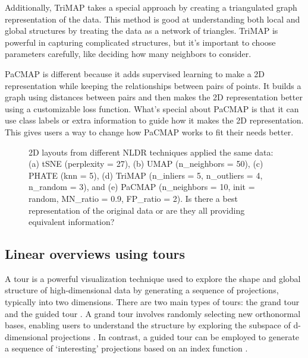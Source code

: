 \documentclass[
  12pt]{article}
\begin{document}
Additionally, TriMAP \citep{article02} takes a special approach by
creating a triangulated graph representation of the data. This method is
good at understanding both local and global structures by treating the
data as a network of triangles. TriMAP is powerful in capturing
complicated structures, but it's important to choose parameters
carefully, like deciding how many neighbors to consider.

PaCMAP \citep{Yingfan2021} is different because it adds supervised
learning to make a 2D representation while keeping the relationships
between pairs of points. It builds a graph using distances between pairs
and then makes the 2D representation better using a customizable loss
function. What's special about PaCMAP is that it can use class labels or
extra information to guide how it makes the 2D representation. This
gives users a way to change how PaCMAP works to fit their needs better.

\begin{figure}


\caption{\label{fig-nldervis}2D layouts from different NLDR techniques
applied the same data: (a) tSNE (perplexity = 27), (b) UMAP
(n\_neighbors = 50), (c) PHATE (knn = 5), (d) TriMAP (n\_inliers = 5,
n\_outliers = 4, n\_random = 3), and (e) PaCMAP (n\_neighbors = 10, init
= random, MN\_ratio = 0.9, FP\_ratio = 2). Is there a best
representation of the original data or are they all providing equivalent
information?}

\end{figure}%

\subsection{Linear overviews using
tours}\label{linear-overviews-using-tours}

A tour is a powerful visualization technique used to explore the shape
and global structure of high-dimensional data by generating a sequence
of projections, typically into two dimensions. There are two main types
of tours: the grand tour \citep{Asimov1985} and the guided tour
\citep{article29}. A grand tour involves randomly selecting new
orthonormal bases, enabling users to understand the structure by
exploring the subspace of d-dimensional projections \citep{Asimov1985}.
In contrast, a guided tour can be employed to generate a sequence of
`interesting' projections based on an index function \citep{article29}.
\end{document}
